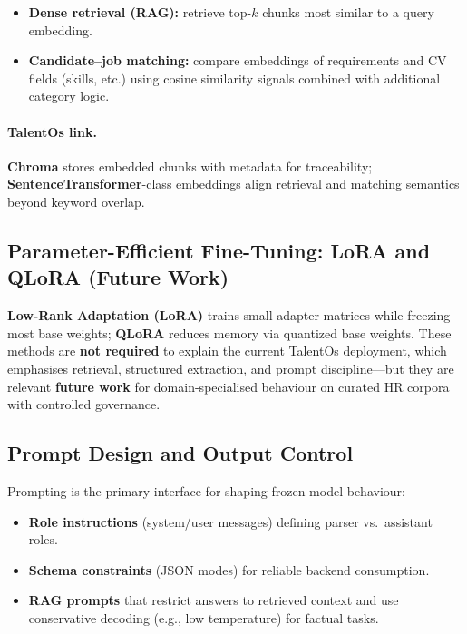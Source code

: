 \begin{itemize}
    \item \textbf{Dense retrieval (RAG):} retrieve top-$k$ chunks most similar to a query embedding.
    \item \textbf{Candidate--job matching:} compare embeddings of requirements and CV fields (skills, etc.) using cosine similarity signals combined with additional category logic.
\end{itemize}

\paragraph{TalentOs link.}
\textbf{Chroma} stores embedded chunks with metadata for traceability; \textbf{SentenceTransformer}-class embeddings align retrieval and matching semantics beyond keyword overlap.

\subsection{Parameter-Efficient Fine-Tuning: LoRA and QLoRA (Future Work)}
\label{sec:ch4:lora_qlora}

\textbf{Low-Rank Adaptation (LoRA)} trains small adapter matrices while freezing most base weights; \textbf{QLoRA} reduces memory via quantized base weights. These methods are \textbf{not required} to explain the current TalentOs deployment, which emphasises retrieval, structured extraction, and prompt discipline—but they are relevant \textbf{future work} for domain-specialised behaviour on curated HR corpora with controlled governance.

\subsection{Prompt Design and Output Control}
\label{sec:ch4:prompt_engineering}

Prompting is the primary interface for shaping frozen-model behaviour:

\begin{itemize}
    \item \textbf{Role instructions} (system/user messages) defining parser vs.\ assistant roles.
    \item \textbf{Schema constraints} (JSON modes) for reliable backend consumption.
    \item \textbf{RAG prompts} that restrict answers to retrieved context and use conservative decoding (e.g., low temperature) for factual tasks.
\end{itemize}

